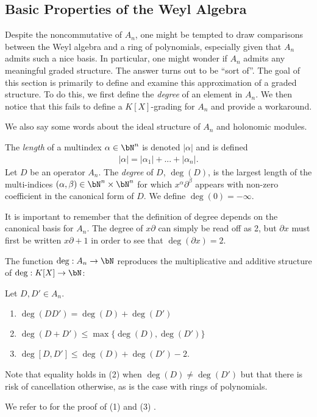 \subsection{Basic Properties of the Weyl Algebra}

Despite the noncommutative of $A_n$, one might be tempted to draw comparisons between the Weyl algebra and a ring of polynomials, especially given that $A_n$ admits such a nice basis. In particular, one might wonder if $A_n$ admits any meaningful graded structure. The answer turns out to be ``sort of''. The goal of this section is primarily to define and examine this approximation of a graded structure. To do this, we first define the \emph{degree} of an element in $A_n$. We then notice that this fails to define a $K[X]$-grading for $A_n$ and provide a workaround.

We also say some words about the ideal structure of $A_n$ and holonomic modules.

\begin{defn}\label{defn:degree-of-Weyl-operator}
	The \emph{length} of a multindex $\alpha \in \bN^n$ is denoted $|\alpha|$ and is defined
	\begin{align*}
		|\alpha| = |\alpha_1| + ... + |\alpha_n|.
	\end{align*}
	Let $D$ be an operator $A_n$. The \emph{degree} of $D$, $\deg(D)$, is the largest length of the multi-indices $(\alpha, \beta) \in \bN^n \times \bN^n$ for which $x^\alpha\partial^\beta$ appears with non-zero coefficient in the canonical form of $D$. We define $\deg(0) = -\infty$.
\end{defn}
It is important to remember that the definition of degree depends on the canonical basis for $A_n$. The degree of $x\partial$ can simply be read off as 2, but $\partial x$ must first be written $x\partial + 1$ in order to see that $\deg(\partial x) = 2$.

The function $\deg: A_n\to \bN$ reproduces the multiplicative and additive structure of $\deg:K[X]\to \bN$:
\begin{thm}\label{thm:degree-properties}
    Let $D,D' \in A_n$.
	\begin{enumerate}[(1)]
		\item $\deg(DD') = \deg(D) + \deg(D')$
		\item $\deg(D+D') \leq \max\{\deg(D), \deg(D')\}$
		\item $\deg[D,D']\leq \deg(D) + \deg(D') - 2$.
	\end{enumerate}
\end{thm}
Note that equality holds in (2) when $\deg(D) \neq \deg(D')$ but that there is risk of cancellation otherwise, as is the case with rings of polynomials.
\begin{prf}
	We refer to \cite{d-mod-primer} for the proof of (1) and (3) .
\end{prf}

